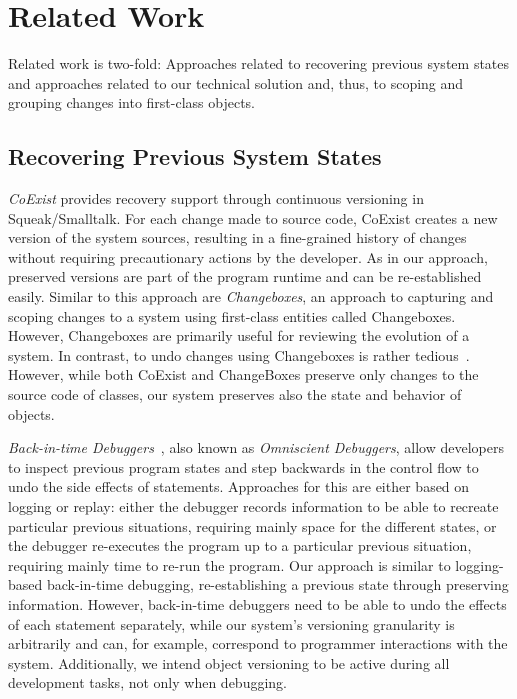 \documentclass{sigplanconf}
\newcommand{\coexist}{CoExist\xspace}
\begin{document}
\section{Related Work} \label{chapter:RELATED_WORK}

Related work is two-fold: Approaches related to recovering previous system states and approaches related to our technical solution and, thus, to scoping and grouping changes into first-class objects.

\subsection{Recovering Previous System States}

\emph{\coexist}\cite{Steinert2012COE} provides recovery support through continuous versioning in Squeak/Smalltalk.
For each change made to source code, \coexist creates a new version of the system sources, resulting in a fine-grained history of changes without requiring precautionary actions by the developer.
As in our approach, preserved versions are part of the program runtime and can be re-established easily.
Similar to this approach are \emph{Changeboxes}\cite{Denker2007EEC}, an approach to capturing and scoping changes to a system using first-class entities called Changeboxes.
However, Changeboxes are primarily useful for reviewing the evolution of a system. 
In contrast, to undo changes using Changeboxes is rather tedious~\cite{Steinert2012COE}.
However, while both \coexist and ChangeBoxes preserve only changes to
the source code of classes, our system preserves also the state and
behavior of objects.

\emph{Back-in-time Debuggers}~\cite{Lewis2003BIT}, also known as \emph{Omniscient Debuggers}, allow developers to inspect previous program states and step backwards in the control flow to undo the side effects of statements.
Approaches for this are either based on logging or replay: either the debugger records information to be able to recreate particular previous situations, requiring mainly space for the different states, or the debugger re-executes the program up to a particular previous situation, requiring mainly time to re-run the program.
Our approach is similar to logging-based back-in-time debugging, re-establishing a previous state through preserving information.
However, back-in-time debuggers need to be able to undo the effects of each statement separately, while our system's versioning granularity is arbitrarily and can, for example, correspond to programmer interactions with the system.
Additionally, we intend object versioning to be active during all development tasks, not only when debugging.
\end{document}
